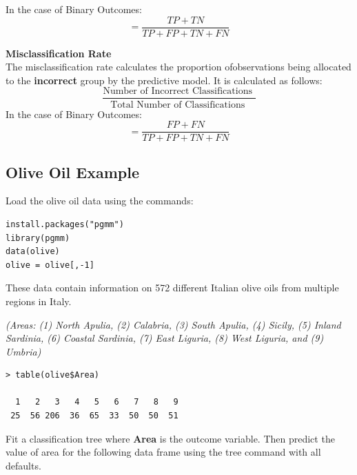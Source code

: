 \documentclass[caret-main.tex]{subfiles}
\begin{document}
In the case of Binary Outcomes:
\[ = \frac{TP + TN}{TP+FP+TN+FN}\]


\noindent \textbf{Misclassification Rate}\\
The misclassification rate calculates the proportion ofobservations being allocated to the \textbf{incorrect} group by the predictive model. It is calculated as follows:
\[ \frac{
\mbox{Number of Incorrect Classifications }}{\mbox{Total Number of Classifications }} \]
In the case of Binary Outcomes:
\[ = \frac{FP + FN}{TP+FP+TN+FN}\]






\newpage
\subsection{Olive Oil Example}

Load the olive oil data using the commands:
\begin{framed}
\begin{verbatim}
install.packages("pgmm")
library(pgmm)
data(olive)
olive = olive[,-1]
\end{verbatim}
\end{framed}
\noindent These data contain information on 572 different Italian olive oils from multiple regions in Italy. 

\noindent \textit{(Areas: (1) North Apulia, (2) Calabria, (3) South Apulia, (4) Sicily, (5) Inland Sardinia, (6) Coastal Sardinia, (7) East Liguria, (8) West Liguria, and (9) Umbria)}
\begin{verbatim}
> table(olive$Area)

  1   2   3   4   5   6   7   8   9 
 25  56 206  36  65  33  50  50  51
\end{verbatim}
\noindent Fit a classification tree where \textbf{Area} is the outcome variable.
Then predict the value of area for the following data frame using the tree
command with all defaults.
\end{document}

